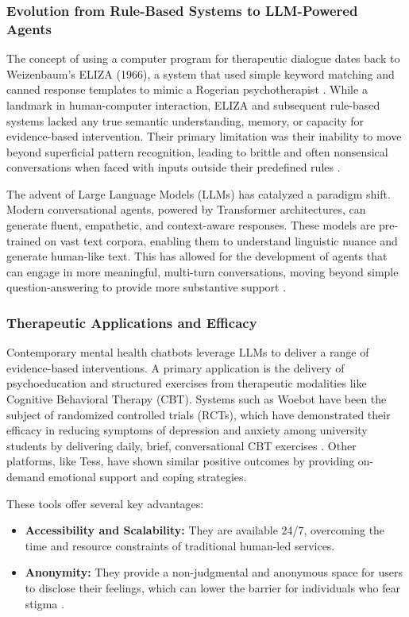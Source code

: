 \subsubsection{Evolution from Rule-Based Systems to LLM-Powered Agents}
The concept of using a computer program for therapeutic dialogue dates back to Weizenbaum's ELIZA (1966), a system that used simple keyword matching and canned response templates to mimic a Rogerian psychotherapist \cite{shum2018conversationalsystems,alamin2024historychatbots}. While a landmark in human-computer interaction, ELIZA and subsequent rule-based systems lacked any true semantic understanding, memory, or capacity for evidence-based intervention. Their primary limitation was their inability to move beyond superficial pattern recognition, leading to brittle and often nonsensical conversations when faced with inputs outside their predefined rules \cite{shum2018conversationalsystems}.

The advent of Large Language Models (LLMs) has catalyzed a paradigm shift. Modern conversational agents, powered by Transformer architectures, can generate fluent, empathetic, and context-aware responses. These models are pre-trained on vast text corpora, enabling them to understand linguistic nuance and generate human-like text. This has allowed for the development of agents that can engage in more meaningful, multi-turn conversations, moving beyond simple question-answering to provide more substantive support \cite{alamin2024historychatbots}.

\subsubsection{Therapeutic Applications and Efficacy}
Contemporary mental health chatbots leverage LLMs to deliver a range of evidence-based interventions. A primary application is the delivery of psychoeducation and structured exercises from therapeutic modalities like Cognitive Behavioral Therapy (CBT). Systems such as Woebot have been the subject of randomized controlled trials (RCTs), which have demonstrated their efficacy in reducing symptoms of depression and anxiety among university students by delivering daily, brief, conversational CBT exercises \cite{woebotRCT2024,eltahawy2024robotsdottherapy}. Other platforms, like Tess, have shown similar positive outcomes by providing on-demand emotional support and coping strategies.

These tools offer several key advantages:
\begin{itemize}
    \item \textbf{Accessibility and Scalability:} They are available 24/7, overcoming the time and resource constraints of traditional human-led services.
    \item \textbf{Anonymity:} They provide a non-judgmental and anonymous space for users to disclose their feelings, which can lower the barrier for individuals who fear stigma \cite{kang2025chatbotstigma}.
\end{itemize}

